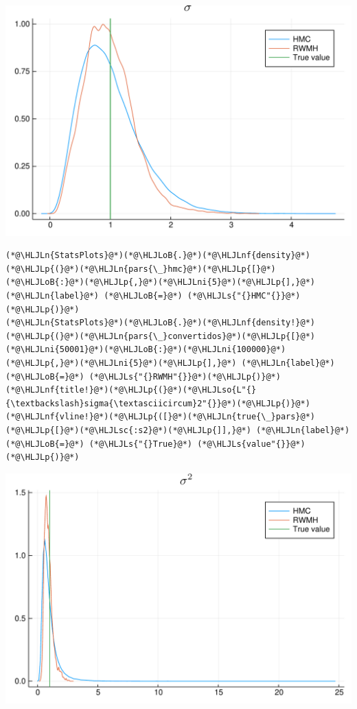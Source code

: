 \documentclass[12pt,a4paper]{article}
\newcommand{\HLJLn}[1]{#1}
\newcommand{\HLJLnf}[1]{\textcolor[RGB]{66,102,213}{#1}}
\newcommand{\HLJLs}[1]{\textcolor[RGB]{201,61,57}{#1}}
\newcommand{\HLJLsc}[1]{\textcolor[RGB]{201,61,57}{#1}}
\newcommand{\HLJLso}[1]{\textcolor[RGB]{201,61,57}{#1}}
\newcommand{\HLJLni}[1]{\textcolor[RGB]{59,151,46}{#1}}
\newcommand{\HLJLoB}[1]{\textcolor[RGB]{102,102,102}{\textbf{#1}}}
\newcommand{\HLJLp}[1]{#1}
\begin{document}
\includegraphics[width=\linewidth]{figures/dsge_and_julia_47_1.pdf}

\begin{lstlisting}
(*@\HLJLn{StatsPlots}@*)(*@\HLJLoB{.}@*)(*@\HLJLnf{density}@*)(*@\HLJLp{(}@*)(*@\HLJLn{pars{\_}hmc}@*)(*@\HLJLp{[}@*)(*@\HLJLoB{:}@*)(*@\HLJLp{,}@*)(*@\HLJLni{5}@*)(*@\HLJLp{],}@*) (*@\HLJLn{label}@*) (*@\HLJLoB{=}@*) (*@\HLJLs{"{}HMC"{}}@*)(*@\HLJLp{)}@*)
(*@\HLJLn{StatsPlots}@*)(*@\HLJLoB{.}@*)(*@\HLJLnf{density!}@*)(*@\HLJLp{(}@*)(*@\HLJLn{pars{\_}convertidos}@*)(*@\HLJLp{[}@*)(*@\HLJLni{50001}@*)(*@\HLJLoB{:}@*)(*@\HLJLni{100000}@*)(*@\HLJLp{,}@*)(*@\HLJLni{5}@*)(*@\HLJLp{],}@*) (*@\HLJLn{label}@*) (*@\HLJLoB{=}@*) (*@\HLJLs{"{}RWMH"{}}@*)(*@\HLJLp{)}@*)
(*@\HLJLnf{title!}@*)(*@\HLJLp{(}@*)(*@\HLJLso{L"{}{\textbackslash}sigma{\textasciicircum}2"{}}@*)(*@\HLJLp{)}@*)
(*@\HLJLnf{vline!}@*)(*@\HLJLp{([}@*)(*@\HLJLn{true{\_}pars}@*)(*@\HLJLp{[}@*)(*@\HLJLsc{:s2}@*)(*@\HLJLp{]],}@*) (*@\HLJLn{label}@*) (*@\HLJLoB{=}@*) (*@\HLJLs{"{}True}@*) (*@\HLJLs{value"{}}@*)(*@\HLJLp{)}@*)
\end{lstlisting}

\includegraphics[width=\linewidth]{figures/dsge_and_julia_48_1.pdf}
\end{document}
